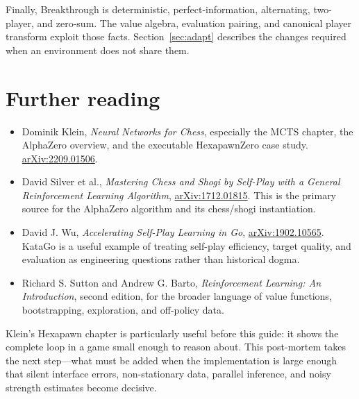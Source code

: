 \documentclass[10.5pt,letterpaper]{article}
\begin{document}
Finally, Breakthrough is deterministic, perfect-information, alternating,
two-player, and zero-sum. The value algebra, evaluation pairing, and canonical
player transform exploit those facts. Section~\ref{sec:adapt} describes the
changes required when an environment does not share them.

\section{Further reading}

\begin{itemize}
  \item Dominik Klein, \emph{Neural Networks for Chess}, especially the MCTS
        chapter, the AlphaZero overview, and the executable HexapawnZero case
        study. \href{https://arxiv.org/abs/2209.01506}{arXiv:2209.01506}.
  \item David Silver et al., \emph{Mastering Chess and Shogi by Self-Play with
        a General Reinforcement Learning Algorithm},
        \href{https://arxiv.org/abs/1712.01815}{arXiv:1712.01815}. This is the
        primary source for the AlphaZero algorithm and its chess/shogi
        instantiation.
  \item David J. Wu, \emph{Accelerating Self-Play Learning in Go},
        \href{https://arxiv.org/abs/1902.10565}{arXiv:1902.10565}. KataGo is a
        useful example of treating self-play efficiency, target quality, and
        evaluation as engineering questions rather than historical dogma.
  \item Richard S. Sutton and Andrew G. Barto, \emph{Reinforcement Learning:
        An Introduction}, second edition, for the broader language of value
        functions, bootstrapping, exploration, and off-policy data.
\end{itemize}

Klein's Hexapawn chapter is particularly useful before this guide: it shows the
complete loop in a game small enough to reason about. This post-mortem takes
the next step---what must be added when the implementation is large enough that
silent interface errors, non-stationary data, parallel inference, and noisy
strength estimates become decisive.
\end{document}
